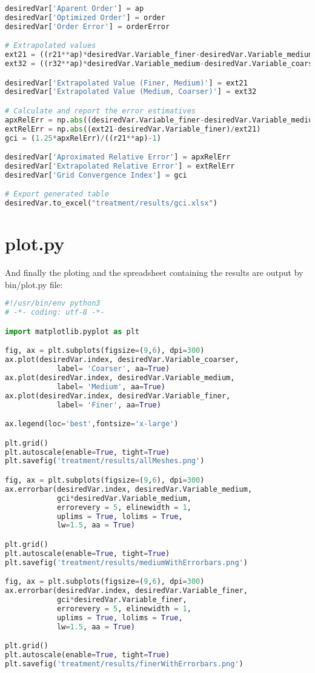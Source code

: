 \documentclass[../main.tex]{subfiles}
\begin{document}
\begin{lstlisting}[language=python]
desiredVar['Aparent Order'] = ap
desiredVar['Optimized Order'] = order
desiredVar['Order Error'] = orderError

# Extrapolated values
ext21 = ((r21**ap)*desiredVar.Variable_finer-desiredVar.Variable_medium)/((r21**ap)-1)
ext32 = ((r32**ap)*desiredVar.Variable_medium-desiredVar.Variable_coarser)/((r32**ap)-1)

desiredVar['Extrapolated Value (Finer, Medium)'] = ext21
desiredVar['Extrapolated Value (Medium, Coarser)'] = ext32

# Calculate and report the error estimatives
apxRelErr = np.abs((desiredVar.Variable_finer-desiredVar.Variable_medium)/desiredVar.Variable_finer)
extRelErr = np.abs((ext21-desiredVar.Variable_finer)/ext21)
gci = (1.25*apxRelErr)/((r21**ap)-1)

desiredVar['Aproximated Relative Error'] = apxRelErr
desiredVar['Extrapolated Relative Error'] = extRelErr
desiredVar['Grid Convergence Index'] = gci

# Export generated table
desiredVar.to_excel("treatment/results/gci.xlsx")  
\end{lstlisting}
\section{plot.py}
And finally the ploting and the spreadsheet containing the results are output by bin/plot.py file: 
\begin{lstlisting}[language=python]
#!/usr/bin/env python3
# -*- coding: utf-8 -*-

import matplotlib.pyplot as plt

fig, ax = plt.subplots(figsize=(9,6), dpi=300)
ax.plot(desiredVar.index, desiredVar.Variable_coarser,
            label= 'Coarser', aa=True)
ax.plot(desiredVar.index, desiredVar.Variable_medium,
            label= 'Medium', aa=True)
ax.plot(desiredVar.index, desiredVar.Variable_finer,
            label= 'Finer', aa=True)

ax.legend(loc='best',fontsize='x-large')

plt.grid()
plt.autoscale(enable=True, tight=True)
plt.savefig('treatment/results/allMeshes.png')

fig, ax = plt.subplots(figsize=(9,6), dpi=300)
ax.errorbar(desiredVar.index, desiredVar.Variable_medium,
            gci*desiredVar.Variable_medium,
            errorevery = 5, elinewidth = 1,
            uplims = True, lolims = True, 
            lw=1.5, aa = True)

plt.grid()
plt.autoscale(enable=True, tight=True)
plt.savefig('treatment/results/mediumWithErrorbars.png')

fig, ax = plt.subplots(figsize=(9,6), dpi=300)
ax.errorbar(desiredVar.index, desiredVar.Variable_finer,
            gci*desiredVar.Variable_finer,
            errorevery = 5, elinewidth = 1,
            uplims = True, lolims = True, 
            lw=1.5, aa = True)

plt.grid()
plt.autoscale(enable=True, tight=True)
plt.savefig('treatment/results/finerWithErrorbars.png')
\end{lstlisting}
\end{document}
